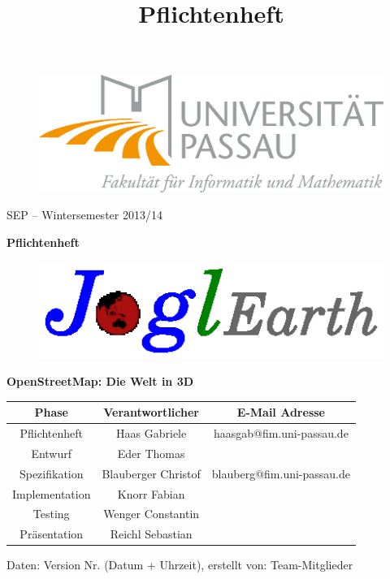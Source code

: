 \documentclass[10pt]{report}
\begin{document}
\title{Pflichtenheft}
\begin{figure}
	\begin{flushright}
		\includegraphics[scale=0.5]{uniLogo.png}
	\end{flushright}
\end{figure}
\begin{center}
\vspace{2.0 cm}
{\LARGE SEP – Wintersemester 2013/14}

\vspace{1.0 cm}
\textbf{{\Huge Pflichtenheft}}

\vspace{0.5 cm}
\begin{figure}[!htb]
\begin{center}
	\includegraphics[scale=1.0]{projektLogo.eps}
\end{center}
\end{figure}



\vspace{0.5 cm}
\textbf{{\Huge OpenStreetMap: Die Welt in 3D}}

\vspace{1.0 cm}
\begin{tabular}{c c c}
Phase & Verantwortlicher & E-Mail Adresse \\
\hline \hline
Pflichtenheft & Haas Gabriele & haasgab@fim.uni-passau.de \\
\hline \hline
Entwurf & Eder Thomas & \\
\hline \hline
Spezifikation & Blauberger Christof & blauberg@fim.uni-passau.de \\
\hline \hline
Implementation & Knorr Fabian & \\
\hline \hline
Testing & Wenger Constantin & \\
\hline \hline
Präsentation & Reichl Sebastian & \\
\end{tabular}


\end{center}
Daten: Version Nr. (Datum + Uhrzeit), erstellt von: Team-Mitglieder
\end{document}
